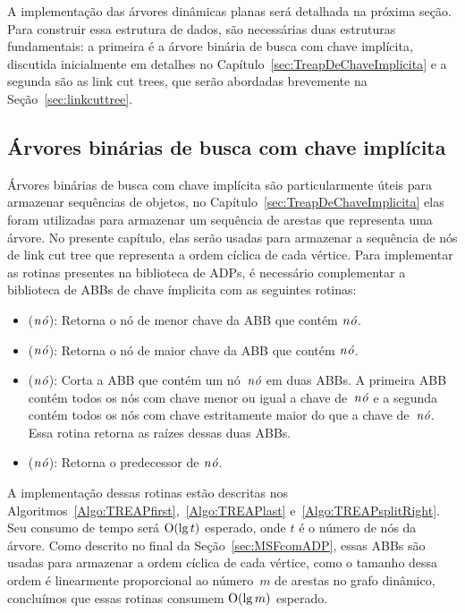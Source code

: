 A implementação das árvores dinâmicas planas será detalhada na próxima seção.
Para construir essa estrutura de dados, são necessárias duas estruturas fundamentais: a primeira é a árvore binária de busca com chave implícita, discutida inicialmente em detalhes no Capítulo~\ref{sec:TreapDeChaveImplicita} e a segunda são as link cut trees, que serão abordadas brevemente na Seção~\ref{sec:linkcuttree}.

\subsection{Árvores binárias de busca com chave implícita}

Árvores binárias de busca com chave implícita são particularmente úteis para armazenar sequências de objetos, no Capítulo~\ref{sec:TreapDeChaveImplicita} elas foram utilizadas para armazenar um sequência de arestas que representa uma árvore.
No presente capítulo, elas serão usadas para armazenar a sequência de nós de link cut tree que representa a ordem cíclica de cada vértice.
Para implementar as rotinas presentes na biblioteca de ADPs, é necessário complementar a biblioteca de ABBs de chave ímplicita com as seguintes rotinas:
\begin{itemize}
\item \treapFirst($\mathit{n\acute{o}}$): Retorna o nó de menor chave da ABB que contém $\mathit{n\acute{o}}$.
\item \treapLast($\mathit{n\acute{o}}$): Retorna o nó de maior chave da ABB que contém $\mathit{n\acute{o}}$.
\item \treapSplitRight($\mathit{n\acute{o}}$): Corta a ABB que contém um nó~$\mathit{n\acute{o}}$ em duas ABBs. A primeira ABB contém todos os nós com chave menor ou igual a chave de~$\mathit{n\acute{o}}$ e a segunda contém todos os nós com chave estritamente maior do que a chave de~$\mathit{n\acute{o}}$. Essa rotina retorna as raízes dessas duas ABBs.
\item \treapPredecessor($\mathit{n\acute{o}}$): Retorna o predecessor de $\mathit{n\acute{o}}$.
\end{itemize}

A implementação dessas rotinas estão descritas nos Algoritmos~\ref{Algo:TREAPfirst},~\ref{Algo:TREAPlast} e~\ref{Algo:TREAPsplitRight}.
Seu consumo de tempo será $\mathrm{O}(\lg t)$ esperado, onde $t$ é o número de nós da árvore.
Como descrito no final da Seção~\ref{sec:MSFcomADP}, essas ABBs são usadas para armazenar a ordem cíclica de cada vértice, como o tamanho dessa ordem é linearmente proporcional ao número~$m$ de arestas no grafo dinâmico, concluímos que essas rotinas consumem $\mathrm{O}(\lg m)$ esperado.  

